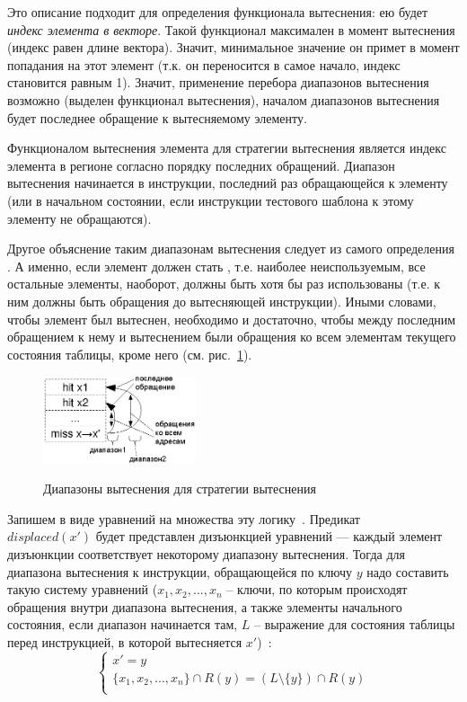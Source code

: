 Это описание подходит для определения функционала вытеснения: ею будет
\emph{индекс элемента в векторе}. Такой функционал максимален в
момент вытеснения (индекс равен длине вектора). Значит, минимальное значение
он примет в момент попадания на этот элемент (т.к. он переносится в самое начало, индекс становится равным 1). Значит, применение перебора диапазонов вытеснения возможно (выделен функционал
вытеснения), началом диапазонов вытеснения будет последнее обращение к вытесняемому элементу.

\begin{utv}
Функционалом вытеснения элемента для стратегии вытеснения \LRU является
индекс элемента в регионе согласно порядку последних обращений.
Диапазон вытеснения начинается в инструкции, последний раз
обращающейся к элементу (или в начальном состоянии, если инструкции
тестового шаблона к этому элементу не обращаются).
\end{utv}

Другое объяснение таким диапазонам вытеснения следует из
самого определения \LRU. А именно, если элемент должен стать \LRU,
т.е. наиболее неиспользуемым, все остальные элементы, наоборот,
должны быть хотя бы раз использованы (т.е. к ним должны быть
обращения до вытесняющей инструкции). Иными словами, чтобы элемент
был вытеснен, необходимо и достаточно, чтобы между последним
обращением к нему и вытеснением были обращения ко всем элементам
текущего состояния таблицы, кроме него (см.
рис.~\ref{lru-ranges}).

\begin{figure}[h] \center
  \includegraphics[width=0.4\textwidth]{2.theor/lru}\\
  \caption{Диапазоны вытеснения для стратегии вытеснения \LRU}\label{lru-ranges}
\end{figure}

Запишем в виде уравнений на множества эту логику~\cite{my_syrcose_2009}.
Предикат\\
$displaced(x')$ будет представлен дизъюнкцией уравнений --- каждый
элемент дизъюнкции соответствует некоторому диапазону вытеснения.
Тогда для диапазона вытеснения к инструкции, обращающейся по ключу
$y$ надо составить такую систему уравнений ($x_1, x_2, ..., x_n$ --
ключи, по которым происходят обращения внутри диапазона
вытеснения, а также элементы начального состояния, если диапазон начинается там,
$L$ --
выражение для состояния таблицы перед инструкцией, в которой вытесняется $x'$)~\cite{my_programmirovanie_2010, my_isp_2009, my_syrcose_2009}:
$$
\left\{
   \begin{array}{l}
    x' = y \\
    \{x_1, x_2, ..., x_n\} \cap R(y) = (L \setminus \{y\}) \cap R(y)\\
   \end{array}
  \right.
$$

